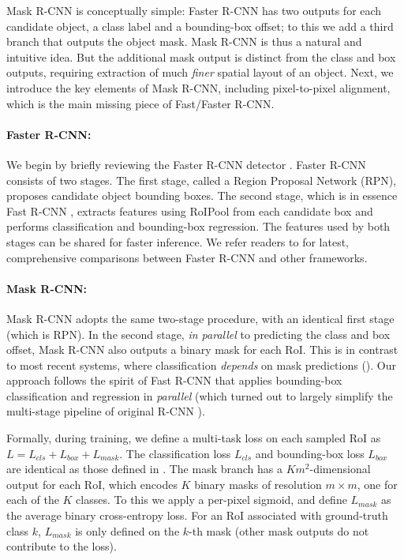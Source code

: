 \documentclass[10pt,twocolumn,letterpaper]{article}
\def\x{\times}
\begin{document}
Mask R-CNN is conceptually simple: Faster R-CNN has two outputs for each candidate object, a class label and a bounding-box offset; to this we add a third branch that outputs the object mask. Mask R-CNN is thus a natural and intuitive idea. But the additional mask output is distinct from the class and box outputs, requiring extraction of much \emph{finer} spatial layout of an object. Next, we introduce the key elements of Mask R-CNN, including pixel-to-pixel alignment, which is the main missing piece of Fast/Faster R-CNN.

\paragraph{Faster R-CNN:} We begin by briefly reviewing the Faster R-CNN detector \cite{Ren2015a}. Faster R-CNN consists of two stages. The first stage, called a Region Proposal Network (RPN), proposes candidate object bounding boxes. The second stage, which is in essence Fast R-CNN \cite{Girshick2015a}, extracts features using RoIPool from each candidate box and performs classification and bounding-box regression. The features used by both stages can be shared for faster inference. We refer readers to \cite{Huang2017} for latest, comprehensive comparisons between Faster R-CNN and other frameworks.

\paragraph{Mask R-CNN:} Mask R-CNN adopts the same two-stage procedure, with an identical first stage (which is RPN). In the second stage, \emph{in parallel} to predicting the class and box offset, Mask R-CNN also outputs a binary mask for each RoI. This is in contrast to most recent systems, where classification \emph{depends} on mask predictions (\eg \cite{Pinheiro2015, Dai2016, Li2017}). Our approach follows the spirit of Fast R-CNN \cite{Girshick2015a} that applies bounding-box classification and regression in \emph{parallel} (which turned out to largely simplify the multi-stage pipeline of original R-CNN \cite{Girshick2014}).

Formally, during training, we define a multi-task loss on each sampled RoI as $L = L_{cls} + L_{box} + L_{mask}$. The classification loss $L_{cls}$ and bounding-box loss $L_{box}$ are identical as those defined in \cite{Girshick2015a}. The mask branch has a $Km^2$-dimensional output for each RoI, which encodes $K$ binary masks of resolution $m \x m$, one for each of the $K$ classes. To this we apply a per-pixel sigmoid, and define $L_{mask}$ as the average binary cross-entropy loss. For an RoI associated with ground-truth class $k$, $L_{mask}$ is only defined on the $k$-th mask (other mask outputs do not contribute to the loss).
\end{document}
